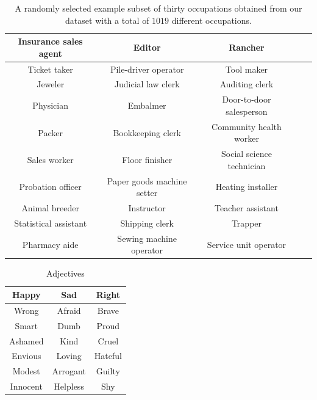 \documentclass[fleqn,10pt]{article}
\begin{document}
\begin{table}[H]
\small{
	\centering
	\begin{tabular}{|c|c|c|c|c|}
	\hline
	Insurance sales agent 	& Editor 						& Rancher 					\\ \hline
	Ticket taker 			& Pile-driver operator 			& Tool maker 				\\ \hline
	Jeweler 				& Judicial law clerk 			& Auditing clerk 			\\ \hline
	Physician 				& Embalmer 						& Door-to-door salesperson 	\\ \hline
	Packer 					& Bookkeeping clerk 			& Community health worker 	\\ \hline
	Sales worker 			& Floor finisher 				& Social science technician \\ \hline
	Probation officer 		& Paper goods machine setter 	& Heating installer 		\\ \hline
	Animal breeder 			& Instructor 					& Teacher assistant 		\\ \hline
	Statistical assistant 	& Shipping clerk 				& Trapper 					\\ \hline
	Pharmacy aide 			& Sewing machine operator 		& Service unit operator 	\\ \hline
	\end{tabular}
	\caption{A randomly selected example subset of thirty occupations obtained from our dataset with a total of $1019$ different occupations.}
	\label{tab:occupations-examples}
	}
\end{table}

\begin{table}[H]
\small{
	\centering
	\begin{tabular}{|c|c|c|}
	\hline
	Happy 		& Sad 		& Right 	\\ \hline
	Wrong 		& Afraid	& Brave 	\\ \hline
	Smart		& Dumb		& Proud 	\\ \hline
	Ashamed		& Kind		& Cruel 	\\ \hline
	Envious		& Loving	& Hateful 	\\ \hline
	Modest 		& Arrogant	& Guilty	\\ \hline
	Innocent	& Helpless	& Shy		\\ \hline
	\end{tabular}
	\caption{Adjectives}
	\label{tab:adjectives}
	}
\end{table}
\end{document}
